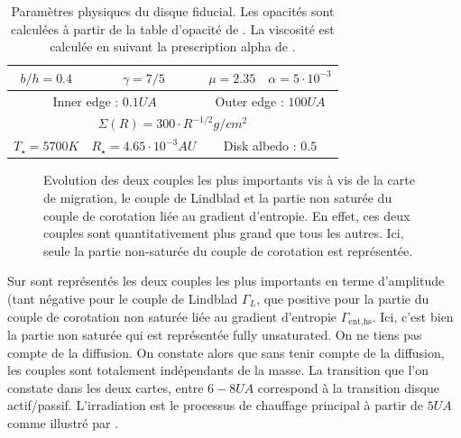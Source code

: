 \begin{table}[htb]
\centering
\begin{tabular}{|c|c|c|c|}
\hline
$b/h = 0.4$ & $\gamma = 7/5$ & $\mu = 2.35$ & $\alpha = 5\cdot 10^{-3}$ \\\hline
\multicolumn{2}{|c|}{Inner edge : $0.1\unit{UA}$} & \multicolumn{2}{c|}{Outer edge : $100\unit{UA}$}\\\hline
\multicolumn{4}{|c|}{$\Sigma(R) = 300 \cdot R^{-1/2}\unit{g/cm^2}$}\\\hline
$T_\star = 5700\unit{K}$ & $R_\star = 4.65\cdot 10^{-3}\unit{AU}$ & \multicolumn{2}{c|}{Disk albedo : $0.5$}\\\hline
\end{tabular}
\caption{Paramètres physiques du disque fiducial. Les opacités sont calculées à partir de la table d'opacité de \cite{hure2000transition}. La viscosité est calculée en suivant la prescription alpha de \cite{shakura1973black}.}\label{tab:fiducial_parameters}
\end{table}

\begin{figure}[htb]
\centering
{}\hfill
{}

\caption{Evolution des deux couples les plus importants vis à vis de la carte de migration, le couple de Lindblad et la partie non saturée du couple de corotation liée au gradient d'entropie. En effet, ces deux couples sont quantitativement plus grand que tous les autres. Ici, seule la partie non-saturée du couple de corotation est représentée.}\label{fig:details_maps}
\end{figure}

Sur  sont représentés les deux couples les plus importants en terme d'amplitude (tant négative pour le couple de Lindblad $\Gamma_L$, que positive pour la partie du couple de corotation non saturée liée au gradient d'entropie $\Gamma_\text{ent,hs}$. Ici, c'est bien la partie non saturée qui est représentée \og fully unsaturated\fg. On ne tiens pas compte de la diffusion. On constate alors que sans tenir compte de la diffusion, les couples sont totalement indépendants de la masse. La transition que l'on constate dans les deux cartes, entre $6-8\unit{UA}$ correspond à la transition disque actif/passif. L'irradiation est le processus de chauffage principal à partir de $5\unit{UA}$ comme illustré par .

